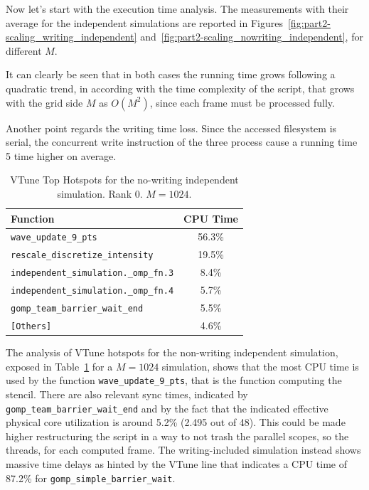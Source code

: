 Now let's start with the execution time analysis. The measurements
with their average for the independent simulations
are reported in Figures~\ref{fig:part2-scaling_writing_independent}
and~\ref{fig:part2-scaling_nowriting_independent}, for different $M$.

It can clearly be seen that in both cases the running time grows
following a quadratic trend,
in according with the time complexity of the script, that grows with
the grid side $M$ as
$O(M^2)$, since each frame must be processed fully.

Another point regards the writing time loss. Since the accessed
filesystem is serial, the concurrent
write instruction of the three process cause a running time 5 time
higher on average.

\begin{table}[h]
  \centering
  \small
  \begin{tabular}{lc}
    \toprule
    Function & CPU Time \\
    \midrule
    \texttt{wave\_update\_9\_pts} & 56.3\% \\
    \texttt{rescale\_discretize\_intensity} & 19.5\% \\
    \texttt{independent\_simulation.\_omp\_fn.3} & 8.4\% \\
    \texttt{independent\_simulation.\_omp\_fn.4} & 5.7\% \\
    \texttt{gomp\_team\_barrier\_wait\_end} & 5.5\% \\
    \texttt{[Others]} & 4.6\% \\
    \bottomrule
  \end{tabular}
  \caption{VTune Top Hotspots for the
  no-writing independent simulation. Rank 0. $M = 1024$.}
  \label{tab:vtune_hotspots_independent}
\end{table}

The analysis of VTune hotspots for the non-writing independent
simulation, exposed in
Table~\ref{tab:vtune_hotspots_independent} for a $M=1024$ simulation,
shows that the most CPU
time is used by the function
\texttt{wave\_update\_9\_pts}, that is the function computing the
stencil. There are also relevant sync times,
indicated by \texttt{gomp\_team\_barrier\_wait\_end} and by
the fact that the indicated effective physical core utilization is
around 5.2\% (2.495 out of 48). This could be made higher
restructuring the script in a way
to not trash the parallel scopes, so the threads, for each computed frame.
The writing-included simulation instead shows massive time delays as
hinted by the VTune line
that indicates a CPU time of 87.2\%
for \texttt{gomp\_simple\_barrier\_wait}.


